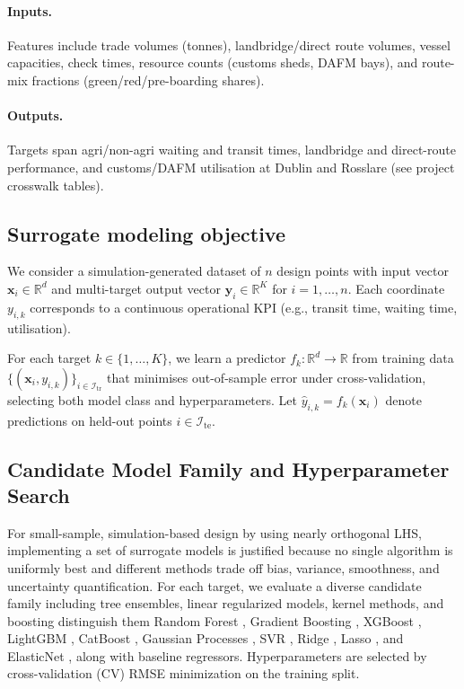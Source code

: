 \documentclass[12pt,twocolumn,a4paper]{article}
\theoremstyle{plain}
\theoremstyle{definition}
\theoremstyle{remark}
\begin{document}
\paragraph{Inputs.}
Features include trade volumes (tonnes), landbridge/direct route volumes, vessel capacities, check times, resource counts (customs sheds, DAFM bays), and route-mix fractions (green/red/pre-boarding shares).

\paragraph{Outputs.}
Targets span agri/non-agri waiting and transit times, landbridge and direct-route performance, and customs/DAFM utilisation at Dublin and Rosslare (see project crosswalk tables).

\subsection{Surrogate modeling objective}
We consider a simulation-generated dataset of $n$ design points with input vector
$\mathbf{x}_i \in \mathbb{R}^{d}$ and multi-target output vector $\mathbf{y}_i \in \mathbb{R}^{K}$ for $i=1,\ldots,n$.
Each coordinate $y_{i,k}$ corresponds to a continuous operational KPI (e.g., transit time, waiting time, utilisation).

For each target $k \in \{1,\ldots,K\}$, we learn a predictor
$f_k : \mathbb{R}^{d} \rightarrow \mathbb{R}$ from training data $\{(\mathbf{x}_i, y_{i,k})\}_{i \in \mathcal{I}_{\mathrm{tr}}}$
that minimises out-of-sample error under cross-validation, selecting both model class and hyperparameters.
Let $\hat{y}_{i,k} = f_k(\mathbf{x}_i)$ denote predictions on held-out points $i \in \mathcal{I}_{\mathrm{te}}$.

\subsection{Candidate Model Family and Hyperparameter Search}
For small-sample, simulation-based design by using nearly orthogonal LHS, implementing a set of surrogate models is justified because no single algorithm is uniformly best and different methods trade off bias, variance, smoothness, and uncertainty quantification. For each target, we evaluate a diverse candidate family including tree ensembles, linear regularized models, kernel methods, and boosting distinguish them Random Forest \cite{breiman2001random}, Gradient Boosting \cite{friedman2001gradient}, XGBoost \cite{chen2016xgboost}, LightGBM \cite{ke2017lightgbm}, CatBoost \cite{prokhorenkova2018catboost}, Gaussian Processes \cite{rasmussen2006gpml}, SVR \cite{cortes1995svm}, Ridge \cite{hoerl1970ridge}, Lasso \cite{tibshirani1996lasso}, and ElasticNet \cite{zou2005elasticnet}, along with baseline regressors. Hyperparameters are selected by cross-validation (CV) RMSE minimization on the training split.
\end{document}

